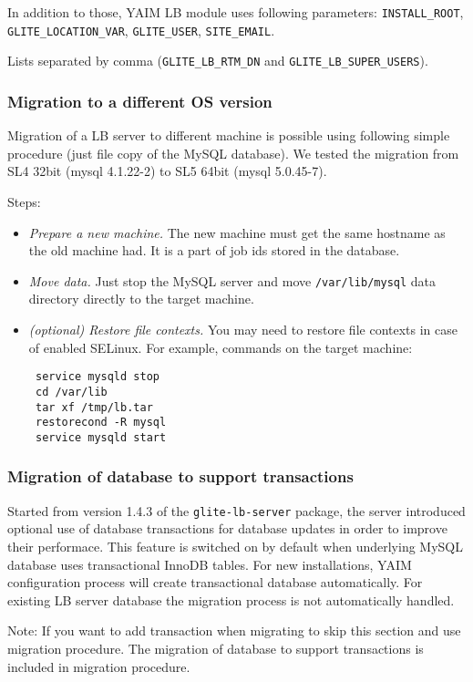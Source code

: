 In addition to those, YAIM LB module uses following parameters:
\texttt{INSTALL\_ROOT}, \texttt{GLITE\_LOCATION\_VAR}, \texttt{GLITE\_USER}, \texttt{SITE\_EMAIL}.

Lists separated by comma (\texttt{GLITE\_LB\_RTM\_DN} and \texttt{GLITE\_LB\_SUPER\_USERS}).

\subsubsection{Migration to a different OS version}
\label{inst:OSmigration}
Migration of a LB server to different machine is possible using
following simple procedure (just file copy of the MySQL database). We
tested the migration from SL4 32bit (mysql 4.1.22-2) to SL5 64bit
(mysql 5.0.45-7).

Steps:
\begin{itemize}
\item \emph{Prepare a new machine.} The new machine must get the same hostname 
 as the old machine had. It is a part of job ids stored in the database.
\item \emph{Move data.} Just stop the MySQL server and move
 \verb'/var/lib/mysql' data directory directly to the target machine.
\item \emph{(optional) Restore file contexts.} You may need to restore file 
 contexts in case of enabled SELinux. For example, commands on the target 
 machine:
 \begin{verbatim}
 service mysqld stop
 cd /var/lib
 tar xf /tmp/lb.tar
 restorecond -R mysql
 service mysqld start
 \end{verbatim}
\end{itemize}

\subsubsection{Migration of database to support transactions}
Started from version 1.4.3 of the \texttt{glite-lb-server}
package, the \LB server introduced optional use of database
transactions for \LB database updates in order to improve their
performace. This feature is switched on by default when underlying
MySQL database uses transactional InnoDB tables. For new
installations, YAIM configuration process will create transactional
database automatically. For existing LB server database the migration 
process is not automatically handled.

Note: If you want to add transaction when migrating to  skip
this section and use  migration procedure. The migration of
database to support transactions is included in  migration procedure.

